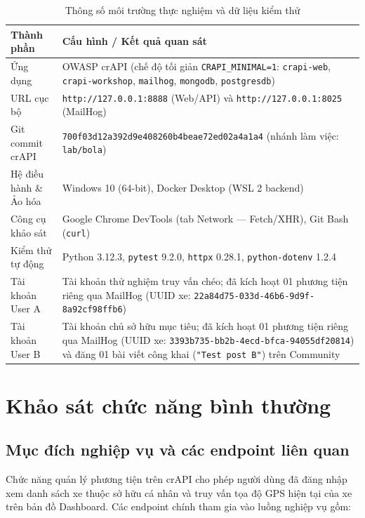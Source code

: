 \documentclass[11pt, a4paper]{article}
\begin{document}
\begin{table}[htbp]
\centering
\caption{Thông số môi trường thực nghiệm và dữ liệu kiểm thử}
\label{tab:env}
\begin{tabularx}{\textwidth}{@{} l X @{}}
\toprule
\textbf{Thành phần} & \textbf{Cấu hình / Kết quả quan sát} \\
\midrule
Ứng dụng & OWASP crAPI (chế độ tối giản \texttt{CRAPI\_MINIMAL=1}: \texttt{crapi-web}, \texttt{crapi-workshop}, \texttt{mailhog}, \texttt{mongodb}, \texttt{postgresdb}) \\
URL cục bộ & \texttt{http://127.0.0.1:8888} (Web/API) và \texttt{http://127.0.0.1:8025} (MailHog) \\
Git commit crAPI & \texttt{700f03d12a392d9e408260b4beae72ed02a4a1a4} (nhánh làm việc: \texttt{lab/bola}) \\
Hệ điều hành \& Ảo hóa & Windows 10 (64-bit), Docker Desktop (WSL 2 backend) \\
Công cụ khảo sát & Google Chrome DevTools (tab Network --- Fetch/XHR), Git Bash (\texttt{curl}) \\
Kiểm thử tự động & Python 3.12.3, \texttt{pytest} 9.2.0, \texttt{httpx} 0.28.1, \texttt{python-dotenv} 1.2.4 \\
Tài khoản User A & Tài khoản thử nghiệm truy vấn chéo; đã kích hoạt 01 phương tiện riêng qua MailHog (UUID xe: \texttt{22a84d75-033d-46b6-9d9f-8a92cf98ffb6}) \\
Tài khoản User B & Tài khoản chủ sở hữu mục tiêu; đã kích hoạt 01 phương tiện riêng qua MailHog (UUID xe: \texttt{3393b735-bb2b-4ecd-bfca-94055df20814}) và đăng 01 bài viết công khai (\texttt{"Test post B"}) trên Community \\
\bottomrule
\end{tabularx}
\end{table}

\section{Khảo sát chức năng bình thường}

\subsection{Mục đích nghiệp vụ và các endpoint liên quan}

Chức năng quản lý phương tiện trên crAPI cho phép người dùng đã đăng nhập xem danh sách xe thuộc sở hữu cá nhân và truy vấn tọa độ GPS hiện tại của xe trên bản đồ Dashboard. Các endpoint chính tham gia vào luồng nghiệp vụ gồm:
\end{document}
